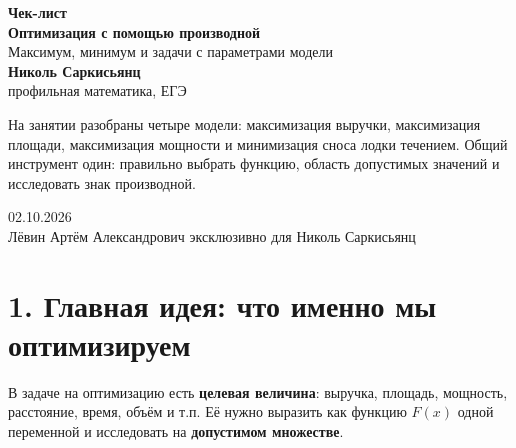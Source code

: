\documentclass[a4paper,12pt]{article}
\newcommand{\key}[1]{\textcolor{darkaccent}{\textbf{#1}}}
\begin{document}
\thispagestyle{empty}
\begin{center}
\vspace*{18mm}
{\Large\color{darkaccent}\textbf{Чек-лист}}\\[5mm]
{\huge\textbf{Оптимизация с помощью производной}}\\[3mm]
{\Large Максимум, минимум и задачи с параметрами модели}\\[14mm]

{\large \textbf{Николь Саркисьянц}}\\[3mm]
{\normalsize профильная математика, ЕГЭ}\\[10mm]

\begin{minipage}{0.78\linewidth}
\centering
\color{textgray}
На занятии разобраны четыре модели: максимизация выручки, максимизация площади, максимизация мощности и минимизация сноса лодки течением. Общий инструмент один: правильно выбрать функцию, область допустимых значений и исследовать знак производной.
\end{minipage}

\vfill
{\large 02.10.2026}\\[9mm]
{\small Лёвин Артём Александрович эксклюзивно для Николь Саркисьянц}

\vspace{10mm}
\end{center}
\clearpage

\section*{1. Главная идея: что именно мы оптимизируем}

В задаче на оптимизацию есть \key{целевая величина}: выручка, площадь, мощность, расстояние, время, объём и т.п. Её нужно выразить как функцию \(F(x)\) одной переменной и исследовать на \key{допустимом множестве}.
\end{document}
